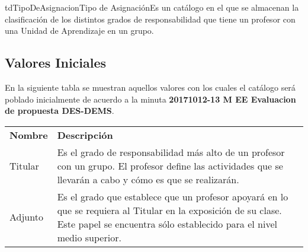 \begin{TipoDeDato}{tdTipoDeAsignacion}{Tipo de Asignación}{Es un catálogo en el que se almacenan la clasificación de los distintos grados de responsabilidad que tiene un profesor con una Unidad de Aprendizaje en un  grupo.}
	
	\begin{tdAtributos}
		
	
	\end{tdAtributos}

	\subsection{Valores Iniciales}
	
	En la siguiente tabla se muestran aquellos valores con los cuales el catálogo será poblado inicialmente de acuerdo a la minuta \textbf{20171012-13 M EE Evaluacion de propuesta DES-DEMS}.\cdtEmpty
	
		\begin{longtable}{| p{} | p{} |}
	 			\rowcolor{colorPrincipal}
	 			\multicolumn{2}{|c|}{\bf \color{white} Valores Iniciales}\\
	 			\hline
	 			\rowcolor{colorSecundario}
	 			\bf \color{white} Nombre & \bf \color{white}Descripción \\
	 			\hline
	 			Titular & Es el grado de responsabilidad más alto de un profesor con un grupo. El profesor define las actividades que se llevarán a cabo y cómo es que se realizarán. \\
	 			\hline
	 			Adjunto &  Es el grado que establece que un profesor apoyará en lo que se requiera al Titular en la exposición de su clase. Este papel se encuentra sólo establecido para el nivel medio superior.\\
	 			\hline
	 		\end{longtable}

\end{TipoDeDato}

